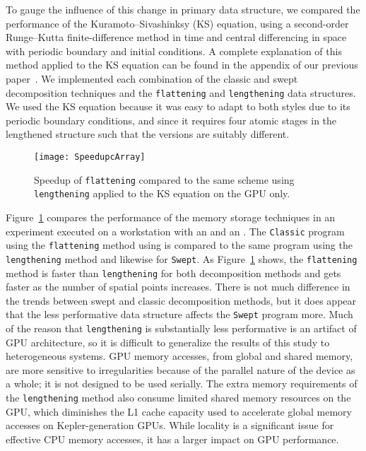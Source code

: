 To gauge the influence of this change in primary data structure, we compared the performance of
the Kuramoto--Sivashinksy (KS) equation, using a second-order
Runge--Kutta finite-difference method in time and central differencing in space with
periodic boundary and initial conditions.
A complete explanation of this method applied to the KS equation can be found in the appendix of our previous paper~\cite{OurJCP}.
We implemented each combination of the classic and swept decomposition techniques and the \texttt{flattening}
and \texttt{lengthening} data structures.
We used the KS equation because it was easy to adapt to both styles due to its periodic boundary conditions,
and since it requires four atomic stages in the lengthened structure such that the versions are suitably different.

\begin{figure}[htbp]
    \centering
    \texttt{[image: SpeedupcArray]}
    \caption{Speedup of \texttt{flattening} compared to the same scheme using \texttt{lengthening} applied to the KS equation on the GPU only.}
    \label{f:lflat}
\end{figure}

Figure~\ref{f:lflat} compares the performance of the memory storage techniques in an
experiment executed on a workstation with an \WCPU{} and an \WGPU{}.
The \texttt{Classic} program using the \texttt{flattening} method using is compared to the same program using the \texttt{lengthening} method and likewise for \texttt{Swept}.
As Figure~\ref{f:lflat} shows, the \texttt{flattening} method is faster than \texttt{lengthening} for both decomposition methods and gets faster as the number of spatial points increases.
There is not much difference in the trends between swept and classic decomposition methods, but it does appear that the less performative data structure affects the \texttt{Swept} program more.
Much of the reason that \texttt{lengthening} is substantially less performative
is an artifact of GPU architecture, so it is difficult to generalize the results of this study to
heterogeneous systems. GPU memory accesses, from global and shared memory, are more sensitive to
irregularities because of the parallel nature of the device as a whole; it is not designed to be used serially.
The extra memory requirements of the \texttt{lengthening} method also consume limited shared memory
resources on the GPU, which diminishes the L1 cache capacity used to accelerate global memory accesses
on Kepler-generation GPUs.
While locality is a significant issue for effective CPU memory accesses, it has a larger impact on GPU performance.

